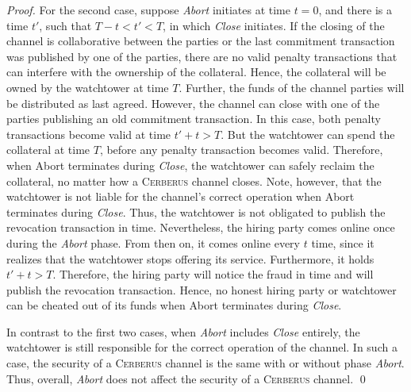 \documentclass[runningheads]{llncs}
\newcommand{\sys}{\textsc{Cerberus}\xspace}
\begin{document}
\begin{proof}
For the second case, suppose \textit{Abort} initiates at time $t=0$, and there is a time $t'$, such that $T-t < t'< T$, in which \textit{Close} initiates.
If the closing of the channel is collaborative between the parties or the last commitment transaction was published by one of the parties, there are no valid penalty transactions that can interfere with the ownership of the collateral. Hence, the collateral will be owned by the watchtower at time $T$. 
Further, the funds of the channel parties will be distributed as last agreed.
However, the channel can close with one of the parties publishing an old commitment transaction. 
In this case, both penalty transactions become valid at time $t'+t>T$. But the watchtower can spend the collateral at time $T$, before any penalty transaction becomes valid. 
Therefore, when {Abort} terminates during \textit{Close}, the watchtower can safely reclaim the collateral, no matter how a \sys channel closes.
Note, however, that the watchtower is not liable for the channel's correct operation when {Abort} terminates during \textit{Close}.
Thus, the watchtower is not obligated to publish the revocation transaction in time.
Nevertheless, the hiring party comes online once during the \textit{Abort} phase. From then on, it comes online every $t$ time, since it realizes that the watchtower stops offering its service. Furthermore, it holds $t'+t>T$.
Therefore, the hiring party will notice the fraud in time and will publish the revocation transaction.
Hence, no honest hiring party or watchtower can be cheated out of its funds when {Abort} terminates during \textit{Close}.


In contrast to the first two cases, when \textit{Abort} includes \textit{Close} entirely, the watchtower is still responsible for the correct operation of the channel.
In such a case, the security of a \sys channel is the same with or without phase \textit{Abort}. 
Thus, overall, \textit{Abort} does not affect the security of a \sys channel.
\hfill \qed
\end{proof}
\end{document}
